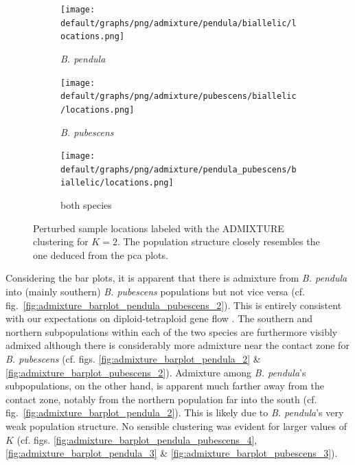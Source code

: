 \documentclass[hidelinks,11pt]{article}
\newcommand{\pendula}{\textit{B. pendula}}
\newcommand{\pubescens}{\textit{B. pubescens}}
\begin{document}
{    \begin{figure}[H]
        \centering
        \begin{subfigure}[b]{0.306\textwidth}
            \centering
            \texttt{[image: default/graphs/png/admixture/pendula/biallelic/locations.png]}
            \caption{\pendula{}}
            \label{fig:locations_admixture_pendula}
        \end{subfigure}
        \hfill
        \begin{subfigure}[b]{0.32\textwidth}
            \centering
            \texttt{[image: default/graphs/png/admixture/pubescens/biallelic/locations.png]}
            \caption{\pubescens{}}
            \label{fig:locations_admixture_pubescens}
        \end{subfigure}
        \hfill
        \begin{subfigure}[b]{0.32\textwidth}
            \centering
            \texttt{[image: default/graphs/png/admixture/pendula\_pubescens/biallelic/locations.png]}
            \caption{both species}
            \label{fig:locations_admixture_pendula_pubescens}
        \end{subfigure}
        \caption{Perturbed sample locations labeled with the \mbox{ADMIXTURE} clustering for $K=2$. The population structure closely resembles the one deduced from the \acrshort{pca} plots.}
        \label{fig:locations_admixture}
    \end{figure}

    Considering the bar plots, it is apparent that there is admixture from \pendula{} into (mainly southern) \pubescens{} populations but not vice versa (cf. fig.~\ref{fig:admixture_barplot_pendula_pubescens_2}). This is entirely consistent with our expectations on diploid-tetraploid gene flow \cite{stebbins,birch-unidirectional-introgression}. The southern and northern subpopulations within each of the two species are furthermore visibly admixed although there is considerably more admixture near the contact zone for \pubescens{} (cf. figs. \ref{fig:admixture_barplot_pendula_2} \& \ref{fig:admixture_barplot_pubescens_2}). Admixture among \pendula{}'s subpopulations, on the other hand, is apparent much farther away from the contact zone, notably from the northern population far into the south (cf. fig.~\ref{fig:admixture_barplot_pendula_2}). This is likely due to \pendula{}'s very weak population structure. No sensible clustering was evident for larger values of $K$ (cf. figs. \ref{fig:admixture_barplot_pendula_pubescens_4}, \ref{fig:admixture_barplot_pendula_3} \& \ref{fig:admixture_barplot_pubescens_3}).

}
\end{document}
